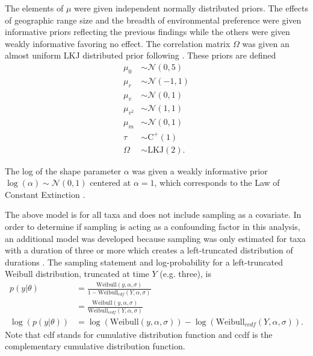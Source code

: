 \documentclass{article}
\begin{document}
The elements of \(\mu\) were given independent normally distributed priors. The effects of geographic range size  and the breadth of environmental preference were given informative priors reflecting the previous findings while the others were given weakly informative favoring no effect. The correlation matrix \(\Omega\) was given an almost uniform LKJ distributed prior following \citep{Team2016}. These priors are defined
\begin{equation*}
  \begin{aligned}
    \mu_{0} &\sim \mathcal{N}(0, 5) \\
    \mu_{r} &\sim \mathcal{N}(-1, 1) \\
    \mu_{v} &\sim \mathcal{N}(0, 1) \\
    \mu_{v^{2}} &\sim \mathcal{N}(1, 1) \\
    \mu_{m} &\sim \mathcal{N}(0, 1) \\
    \tau &\sim \mathrm{C^{+}}(1) \\
    \Omega &\sim \text{LKJ}(2).
  \end{aligned}
  \label{eq:sigma_prior}
\end{equation*}

The log of the shape parameter \(\alpha\) was given a weakly informative prior \(\log(\alpha) \sim \mathcal{N}(0, 1)\) centered at \(\alpha = 1\), which corresponds to the Law of Constant Extinction \citep{VanValen1973}.

The above model is for all taxa and does not include sampling as a covariate. In order to determine if sampling is acting as a confounding factor in this analysis, an additional model was developed because sampling was only estimated for taxa with a duration of three or more which creates a left-truncated distribution of durations \citep{Klein2003}. The sampling statement and log-probability for a left-truncated Weibull distribution, truncated at time \(Y\) (e.g. three), is
\begin{equation}
  \begin{aligned}
    p(y | \theta) &= \frac{\mathrm{Weibull}(y, \alpha, \sigma)}{1 - \mathrm{Weibull}_{cdf}(Y, \alpha, \sigma)} \\
    &= \frac{\mathrm{Weibull}(y, \alpha, \sigma)}{\mathrm{Weibull}_{ccdf}(Y, \alpha, \sigma)} \\
    \log(p(y | \theta)) &= \log(\mathrm{Weibull}(y, \alpha, \sigma)) - \log(\mathrm{Weibull}_{ccdf}(Y, \alpha, \sigma)).
  \end{aligned}
  \label{eq:trunc}
\end{equation}
Note that cdf stands for cumulative distribution function and ccdf is the complementary cumulative distribution function.
\end{document}
